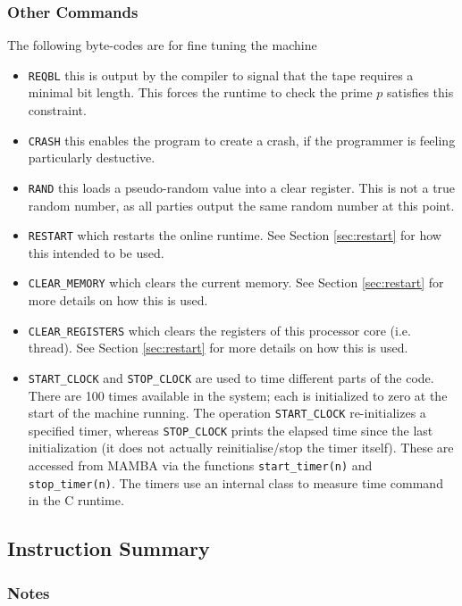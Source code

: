 \subsubsection{Other Commands}
The following byte-codes are for fine tuning the machine
\begin{itemize}
\item \verb+REQBL+ this is output by the compiler to signal that
the tape requires a minimal bit length. This forces the runtime
to check the prime $p$ satisfies this constraint.
\item \verb+CRASH+ this enables the program to create a crash,
if the programmer is feeling particularly destuctive.
\item \verb+RAND+ this loads a pseudo-random value into a
clear register. This is not a true random number, as all
parties output the same random number at this point.
\item \verb+RESTART+ which restarts the online runtime.
See Section \ref{sec:restart} for how this intended to be used.
\item \verb+CLEAR_MEMORY+ which clears the current memory.
See Section \ref{sec:restart} for more details on how this is used.
\item \verb+CLEAR_REGISTERS+ which clears the registers of this processor core (i.e. thread).
See Section \ref{sec:restart} for more details on how this is used.
\item \verb+START_CLOCK+ and \verb+STOP_CLOCK+ are used to time different
parts of the code. There are 100 times available in the system;
each is initialized to zero at the start of the machine running.
The operation \verb+START_CLOCK+ re-initializes a specified timer,
whereas \verb+STOP_CLOCK+ prints the elapsed time since the last
initialization (it does not actually reinitialise/stop the timer itself).
These are accessed from MAMBA via the functions
\verb+start_timer(n)+ and \verb+stop_timer(n)+.
The timers use an internal class to measure time command in the C runtime.
\end{itemize}

\subsection{Instruction Summary}
\label{subsec:instructions}



\subsubsection{Notes}

